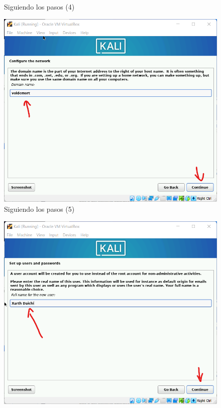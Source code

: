 \documentclass[stu, 12pt, letterpaper, donotrepeattitle, floatsintext, natbib, helv]{apa7}
\begin{document}
\begin{enumerate}
\begin{figure} [H]
        \caption{Siguiendo los pasos (4)}
        \label{fig:Inst4}
    \end{figure}
    \begin{figure} [H]
        \includegraphics[width = 1\textwidth]{Installation5.png}
        \caption{Siguiendo los pasos (5)}
        \label{fig:Inst5}
    \end{figure}
    \begin{figure} [H]
        \includegraphics[width = 1\textwidth]{Installation6.png}

\end{figure}
\end{enumerate}
\end{document}
